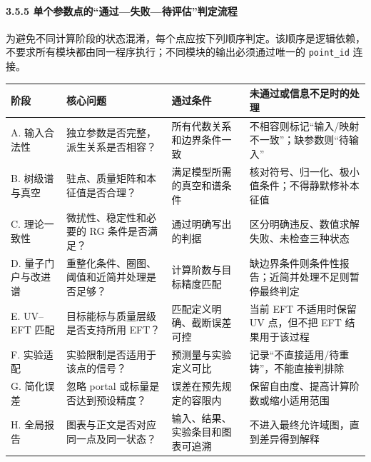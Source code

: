 \documentclass[
  chinese,
  UTF8]{ctexart}
\newcounter{none} %
\begin{document}
\paragraph{3.5.5
单个参数点的``通过---失败---待评估''判定流程}\label{ux5355ux4e2aux53c2ux6570ux70b9ux7684ux901aux8fc7ux5931ux8d25ux5f85ux8bc4ux4f30ux5224ux5b9aux6d41ux7a0b}

为避免不同计算阶段的状态混淆，每个点应按下列顺序判定。该顺序是逻辑依赖，不要求所有模块都由同一程序执行；不同模块的输出必须通过唯一的
\texttt{point\_id} 连接。

{\def\LTcaptype{none} %
\begin{longtable}[]{@{}
  >{\raggedright\arraybackslash}p{}
  >{\raggedright\arraybackslash}p{}
  >{\raggedright\arraybackslash}p{}
  >{\raggedright\arraybackslash}p{}@{}}
\toprule\noalign{}
\begin{minipage}[b]{\linewidth}\raggedright
阶段
\end{minipage} & \begin{minipage}[b]{\linewidth}\raggedright
核心问题
\end{minipage} & \begin{minipage}[b]{\linewidth}\raggedright
通过条件
\end{minipage} & \begin{minipage}[b]{\linewidth}\raggedright
未通过或信息不足时的处理
\end{minipage} \\
\midrule\noalign{}
\endhead
\bottomrule\noalign{}
\endlastfoot
A. 输入合法性 & 独立参数是否完整，派生关系是否相容？ &
所有代数关系和边界条件一致 &
不相容则标记``输入/映射不一致''；缺参数则``待输入'' \\
B. 树级谱与真空 & 驻点、质量矩阵和本征值是否合理？ &
满足模型所需的真空和谱条件 &
核对符号、归一化、极小值条件；不得静默修补本征值 \\
C. 理论一致性 & 微扰性、稳定性和必要的 RG 条件是否满足？ &
通过明确写出的判据 & 区分明确违反、数值求解失败、未检查三种状态 \\
D. 量子门户与改进谱 & 重整化条件、圈图、阈值和近简并处理是否足够？ &
计算阶数与目标精度匹配 &
缺边界条件则条件性报告；近简并处理不足则暂停最终判定 \\
E. UV--EFT 匹配 & 目标能标与质量层级是否支持所用 EFT？ &
匹配定义明确、截断误差可控 & 当前 EFT 不适用时保留 UV 点，但不把 EFT
结果用于该过程 \\
F. 实验适配 & 实验限制是否适用于该点的信号？ & 预测量与实验定义可比 &
记录``不直接适用/待重铸''，不能直接判排除 \\
G. 简化误差 & 忽略 portal 或标量是否达到预设精度？ &
误差在预先规定的容限内 & 保留自由度、提高计算阶数或缩小适用范围 \\
H. 全局报告 & 图表与正文是否对应同一点及同一状态？ &
输入、结果、实验条目和图表可追溯 &
不进入最终允许域图，直到差异得到解释 \\
\end{longtable}
}
\end{document}
